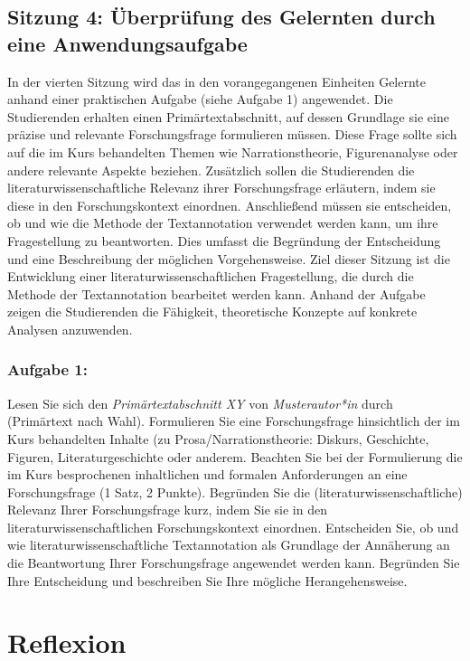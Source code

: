 \documentclass[
          a4paper,
        ]{article}
\begin{document}
\subsection{Sitzung 4: Überprüfung des Gelernten durch eine
Anwendungsaufgabe}\label{sitzung-4-uxfcberpruxfcfung-des-gelernten-durch-eine-anwendungsaufgabe}

In der vierten Sitzung wird das in den vorangegangenen Einheiten
Gelernte anhand einer praktischen Aufgabe (siehe Aufgabe 1) angewendet.
Die Studierenden erhalten einen Primärtextabschnitt, auf dessen
Grundlage sie eine präzise und relevante Forschungsfrage formulieren
müssen. Diese Frage sollte sich auf die im Kurs behandelten Themen wie
Narrationstheorie, Figurenanalyse oder andere relevante Aspekte
beziehen. Zusätzlich sollen die Studierenden die
literaturwissenschaftliche Relevanz ihrer Forschungsfrage erläutern,
indem sie diese in den Forschungskontext einordnen. Anschließend müssen
sie entscheiden, ob und wie die Methode der Textannotation verwendet
werden kann, um ihre Fragestellung zu beantworten. Dies umfasst die
Begründung der Entscheidung und eine Beschreibung der möglichen
Vorgehensweise. Ziel dieser Sitzung ist die Entwicklung einer
literaturwissenschaftlichen Fragestellung, die durch die Methode der
Textannotation bearbeitet werden kann. Anhand der Aufgabe zeigen die
Studierenden die Fähigkeit, theoretische Konzepte auf konkrete Analysen
anzuwenden.

\subsubsection{Aufgabe 1:}\label{aufgabe-1}

Lesen Sie sich den \emph{Primärtextabschnitt XY} von
\emph{Musterautor*in} durch (Primärtext nach Wahl). Formulieren Sie eine
Forschungsfrage hinsichtlich der im Kurs behandelten Inhalte (zu
Prosa/Narrationstheorie: Diskurs, Geschichte, Figuren,
Literaturgeschichte oder anderem. Beachten Sie bei der Formulierung die
im Kurs besprochenen inhaltlichen und formalen Anforderungen an eine
Forschungsfrage (1 Satz, 2 Punkte). Begründen Sie die
(literaturwissenschaftliche) Relevanz Ihrer Forschungsfrage kurz, indem
Sie sie in den literaturwissenschaftlichen Forschungskontext einordnen.
Entscheiden Sie, ob und wie literaturwissenschaftliche Textannotation
als Grundlage der Annäherung an die Beantwortung Ihrer Forschungsfrage
angewendet werden kann. Begründen Sie Ihre Entscheidung und beschreiben
Sie Ihre mögliche Herangehensweise.

\section{Reflexion}\label{reflexion}
\end{document}
